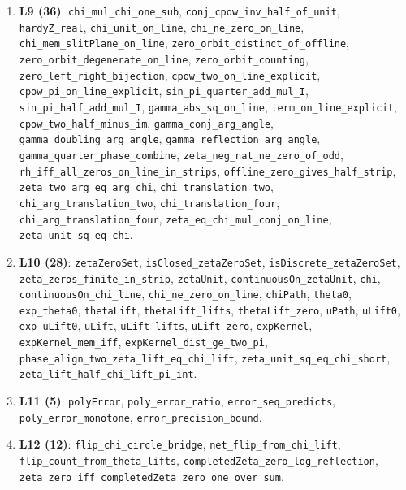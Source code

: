 \documentclass{article}
\begin{document}
{\begin{sloppypar}
\begin{enumerate}
\texttt{recip\_on\_critical\_circle\_iff}, \texttt{zero\_orbit\_four}.
\item \textbf{L9 (36)}: \texttt{chi\_mul\_chi\_one\_sub},
\texttt{conj\_cpow\_inv\_half\_of\_unit}, \texttt{hardyZ\_real},
\texttt{chi\_unit\_on\_line}, \texttt{chi\_ne\_zero\_on\_line},
\texttt{chi\_mem\_slitPlane\_on\_line}, \texttt{zero\_orbit\_distinct\_of\_offline},
\texttt{zero\_orbit\_degenerate\_on\_line}, \texttt{zero\_orbit\_counting},
\texttt{zero\_left\_right\_bijection}, \texttt{cpow\_two\_on\_line\_explicit},
\texttt{cpow\_pi\_on\_line\_explicit}, \texttt{sin\_pi\_quarter\_add\_mul\_I},
\texttt{sin\_pi\_half\_add\_mul\_I}, \texttt{gamma\_abs\_sq\_on\_line},
\texttt{term\_on\_line\_explicit}, \texttt{cpow\_two\_half\_minus\_im},
\texttt{gamma\_conj\_arg\_angle}, \texttt{gamma\_doubling\_arg\_angle},
\texttt{gamma\_reflection\_arg\_angle}, \texttt{gamma\_quarter\_phase\_combine},
\texttt{zeta\_neg\_nat\_ne\_zero\_of\_odd},
\texttt{rh\_iff\_all\_zeros\_on\_line\_in\_strips},
\texttt{offline\_zero\_gives\_half\_strip}, \texttt{zeta\_two\_arg\_eq\_arg\_chi},
\texttt{chi\_translation\_two}, \texttt{chi\_arg\_translation\_two},
\texttt{chi\_translation\_four}, \texttt{chi\_arg\_translation\_four},
\texttt{zeta\_eq\_chi\_mul\_conj\_on\_line}, \texttt{zeta\_unit\_sq\_eq\_chi}.
\item \textbf{L10 (28)}: \texttt{zetaZeroSet}, \texttt{isClosed\_zetaZeroSet},
\texttt{isDiscrete\_zetaZeroSet}, \texttt{zeta\_zeros\_finite\_in\_strip},
\texttt{zetaUnit}, \texttt{continuousOn\_zetaUnit}, \texttt{chi},
\texttt{continuousOn\_chi\_line}, \texttt{chi\_ne\_zero\_on\_line},
\texttt{chiPath}, \texttt{theta0}, \texttt{exp\_theta0}, \texttt{thetaLift},
\texttt{thetaLift\_lifts}, \texttt{thetaLift\_zero}, \texttt{uPath},
\texttt{uLift0}, \texttt{exp\_uLift0}, \texttt{uLift}, \texttt{uLift\_lifts},
\texttt{uLift\_zero}, \texttt{expKernel}, \texttt{expKernel\_mem\_iff},
\texttt{expKernel\_dist\_ge\_two\_pi},
\texttt{phase\_align\_two\_zeta\_lift\_eq\_chi\_lift},
\texttt{zeta\_unit\_sq\_eq\_chi\_short},
\texttt{zeta\_lift\_half\_chi\_lift\_pi\_int}.
\item \textbf{L11 (5)}: \texttt{polyError}, \texttt{poly\_error\_ratio},
\texttt{error\_seq\_predicts}, \texttt{poly\_error\_monotone},
\texttt{error\_precision\_bound}.
\item \textbf{L12 (12)}: \texttt{flip\_chi\_circle\_bridge},
\texttt{net\_flip\_from\_chi\_lift}, \texttt{flip\_count\_from\_theta\_lifts},
\texttt{completedZeta\_zero\_log\_reflection},
\texttt{zeta\_zero\_iff\_completedZeta\_zero\_one\_over\_sum},

\end{enumerate}
\end{sloppypar}}
\end{document}
